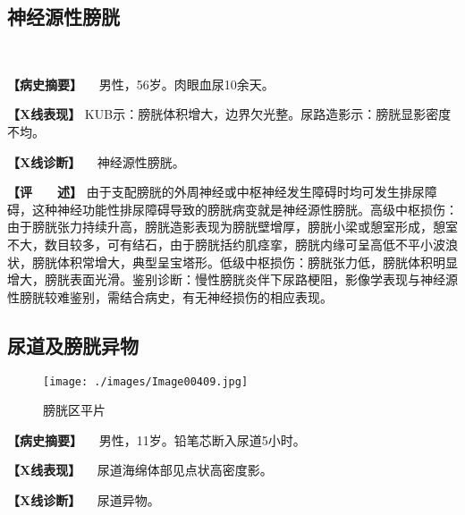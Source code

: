 \subsection{神经源性膀胱}

\begin{figure}
    \centering
    \\
    \caption{}
    \label{fig6-7-2}
\end{figure}

\textbf{【病史摘要】} 　男性，56岁。肉眼血尿10余天。

\textbf{【X线表现】}
KUB示：膀胱体积增大，边界欠光整。尿路造影示：膀胱显影密度不均。

\textbf{【X线诊断】} 　神经源性膀胱。

\textbf{【评　　述】}
由于支配膀胱的外周神经或中枢神经发生障碍时均可发生排尿障碍，这种神经功能性排尿障碍导致的膀胱病变就是神经源性膀胱。高级中枢损伤：由于膀胱张力持续升高，膀胱造影表现为膀胱壁增厚，膀胱小梁或憩室形成，憩室不大，数目较多，可有结石，由于膀胱括约肌痉挛，膀胱内缘可呈高低不平小波浪状，膀胱体积常增大，典型呈宝塔形。低级中枢损伤：膀胱张力低，膀胱体积明显增大，膀胱表面光滑。鉴别诊断：慢性膀胱炎伴下尿路梗阻，影像学表现与神经源性膀胱较难鉴别，需结合病史，有无神经损伤的相应表现。

\subsection{尿道及膀胱异物}

\begin{figure}[!htbp]
    \centering
    \texttt{[image: ./images/Image00409.jpg]}
    \captionsetup{justification=centering}
    \caption{膀胱区平片}
    \label{fig6-7-3}
\end{figure}

\textbf{【病史摘要】} 　男性，11岁。铅笔芯断入尿道5小时。

\textbf{【X线表现】} 　尿道海绵体部见点状高密度影。

\textbf{【X线诊断】} 　尿道异物。

